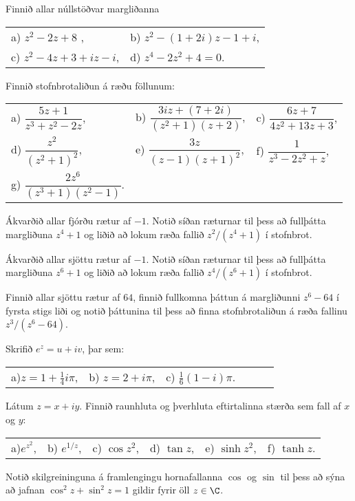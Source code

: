 \daemi Finnið allar núllstöðvar margliðanna 



\begin{tabular}{ll}
a) $z^2-2z+8$ ,
&b) $z^2-(1+2i)z-1+i$,\\
c) $z^2-4z+3+iz-i$,
&d) $z^4 - 2z^2 + 4=0$.\\ 
\end{tabular}


\daemi Finnið stofnbrotaliðun á ræðu föllunum:

\begin{tabular}{lll}
a) $\dfrac{5z+1}{z^3+z^2-2z}$, 
&b) $\dfrac{3iz+(7+2i)}{(z^2+1)(z+2)}$,
&c) $\dfrac{6z+7}{4z^2+13z+3}$,\\
d) $\dfrac{z^2}{(z^2+1)^2}$,
&e) $\dfrac {3z}{(z-1)(z+1)^2}$,
&f) $\dfrac{1}{z^3-2z^2+z}$,\\
g) $\dfrac{2z^6}{(z^3+1)(z^2-1)}$.\\
\end{tabular}

\daemi Ákvarðið allar fjórðu rætur af $-1$.  Notið síðan ræturnar til
þess að fullþátta  margliðuna $z^4+1$  og liðið að lokum
 ræða fallið $z^2/(z^4+1)$ í stofnbrot.


\daemi Ákvarðið allar sjöttu  rætur af $-1$.  Notið síðan ræturnar til
þess að fullþátta  margliðuna $z^6+1$ og  liðið að lokum  ræða fallið
$z^4/(z^6+1)$ í stofnbrot.

\daemi Finnið allar sjöttu rætur af $64$, finnið fullkomna þáttun á
margliðunni $z^6-64$ í fyrsta stigs liði og notið þáttunina til þess
að finna stofnbrotaliðun á ræða fallinu $z^3/(z^6-64)$.


\daemi Skrifið $e^z=u+iv$, þar sem:


\smallskip\noindent
\begin{tabular}{llllll}
 a)$z=1+\tfrac 14i\pi$, 
&b) $z=2+i\pi$,
&c) $\tfrac16(1-i)\pi$.
\end{tabular}

\daemi Látum $z=x+iy$. Finnið raunhluta og þverhluta eftirtalinna
stærða sem fall af $x$ og $y$:

\smallskip\noindent
\begin{tabular}{llllll}
 a)$e^{z^2}$, 
&b) $e^{1/z}$,
&c) $\cos z^2$,
&d) $\tan z$, 
&e) $\sinh z^2$,
&f) $\tanh z$.\\
\end{tabular}


\daemi Notið skilgreininguna á framlengingu hornafallanna $\cos $ og $\sin $ til
þess að sýna að jafnan $\cos^2z+\sin^2z=1$ gildir fyrir öll $z\in \C$. 

